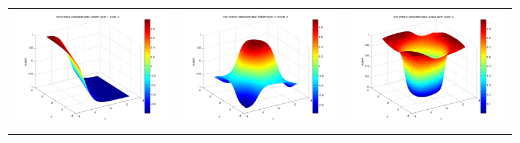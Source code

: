 \documentclass[fleqn]{article}
\begin{document}
\begin{center}
\begin{longtable}{ c | c | r  }
    \includegraphics[scale=0.25]{./pics/nonlinearlyseparable/_4_2/_4_2_epoch_100_hidden layer 1 :3} & \includegraphics[scale=0.25]{./pics/nonlinearlyseparable/_4_2/_4_2_epoch_100_hidden layer 2 :22} & \includegraphics[scale=0.25]{./pics/nonlinearlyseparable/_4_2/_4_2_epoch_100_output layer :3}\\

\end{longtable}
\end{center}
\end{document}
